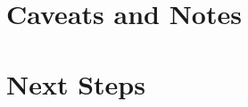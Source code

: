 \documentclass[11pt,a4paper]{article}
\begin{document}
\section{Caveats and Notes}\label{sec:caveats}


\section{Next Steps}\label{sec:next}




\end{document}
